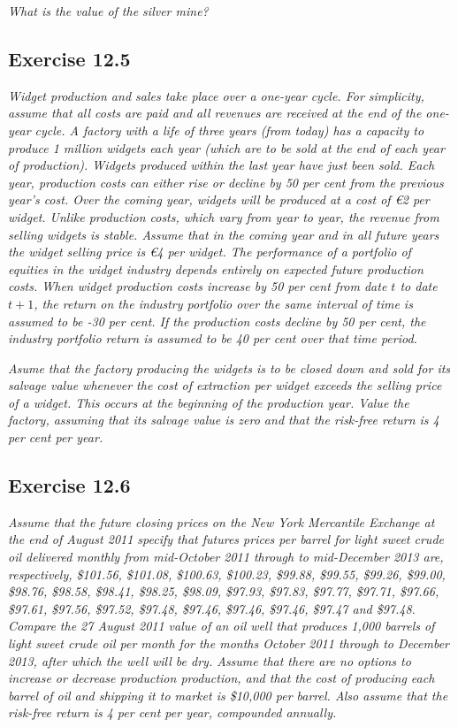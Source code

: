 \documentclass[]{book}
\newcommand{\euro}{€}
\theoremstyle{definition}
\theoremstyle{definition}
\theoremstyle{remark}
\begin{document}
\emph{What is the value of the silver mine?} \citep[p.425]{book}

\subsection{Exercise 12.5}\label{exercise-12.5}

\emph{Widget production and sales take place over a one-year cycle. For
simplicity, assume that all costs are paid and all revenues are received
at the end of the one-year cycle. A factory with a life of three years
(from today) has a capacity to produce 1 million widgets each year
(which are to be sold at the end of each year of production). Widgets
produced within the last year have just been sold. Each year, production
costs can either rise or decline by 50 per cent from the previous year's
cost. Over the coming year, widgets will be produced at a cost of
\euro{}2 per widget. Unlike production costs, which vary from year to
year, the revenue from selling widgets is stable. Assume that in the
coming year and in all future years the widget selling price is \euro{}4
per widget. The performance of a portfolio of equities in the widget
industry depends entirely on expected future production costs. When
widget production costs increase by 50 per cent from date \(t\) to date
\(t+1\), the return on the industry portfolio over the same interval of
time is assumed to be -30 per cent. If the production costs decline by
50 per cent, the industry portfolio return is assumed to be 40 per cent
over that time period.} \citep[p.425]{book}

\emph{Asume that the factory producing the widgets is to be closed down
and sold for its salvage value whenever the cost of extraction per
widget exceeds the selling price of a widget. This occurs at the
beginning of the production year. Value the factory, assuming that its
salvage value is zero and that the risk-free return is 4 per cent per
year.} \citep[p.425-426]{book}

\subsection{Exercise 12.6}\label{exercise-12.6}

\emph{Assume that the future closing prices on the New York Mercantile
Exchange at the end of August 2011 specify that futures prices per
barrel for light sweet crude oil delivered monthly from mid-October 2011
through to mid-December 2013 are, respectively, \$101.56, \$101.08,
\$100.63, \$100.23, \$99.88, \$99.55, \$99.26, \$99.00, \$98.76,
\$98.58, \$98.41, \$98.25, \$98.09, \$97.93, \$97.83, \$97.77, \$97.71,
\$97.66, \$97.61, \$97.56, \$97.52, \$97.48, \$97.46, \$97.46, \$97.46,
\$97.47 and \$97.48. Compare the 27 August 2011 value of an oil well
that produces 1,000 barrels of light sweet crude oil per month for the
months October 2011 through to December 2013, after which the well will
be dry. Assume that there are no options to increase or decrease
production production, and that the cost of producing each barrel of oil
and shipping it to market is \$10,000 per barrel. Also assume that the
risk-free return is 4 per cent per year, compounded annually.}
\citep[p.426]{book}
\end{document}
